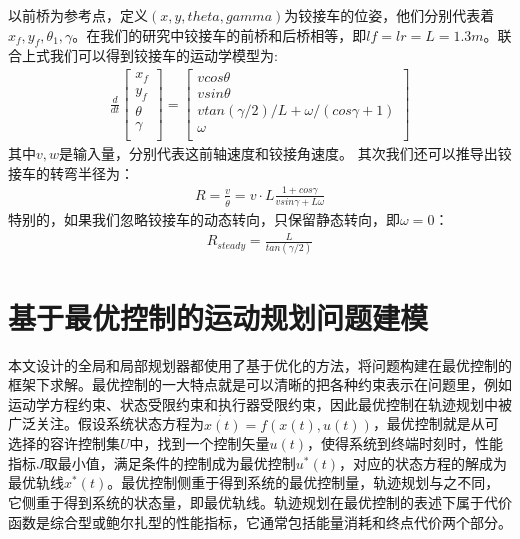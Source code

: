 \documentclass[master,academic]{ysuthesis} %
\begin{document}
	以前桥为参考点，定义$(x,y,theta,gamma)$为铰接车的位姿，他们分别代表着$x_f,y_f,\theta_1,\gamma$。在我们的研究中铰接车的前桥和后桥相等，即$lf=lr=L=1.3m$。联合上式我们可以得到铰接车的运动学模型为:
	\begin{equation}
		\begin{aligned}
			\frac{d}{dt}\left[ \begin{array}{c}
				x_f\\
				y_f\\
				\theta\\
				\gamma\\
			\end{array} \right] =\left[ \begin{array}{c}
				vcos\theta\\
				vsin\theta\\
				vtan( \gamma /2 ) /L+\omega /( cos\gamma +1 )\\
				\omega\\
			\end{array} \right] 
		\end{aligned}
	\end{equation}
	其中$v,w$是输入量，分别代表这前轴速度和铰接角速度。
	其次我们还可以推导出铰接车的转弯半径为：
	\begin{equation}
		\begin{aligned}
			R = \frac{v}{\dot{\theta}} = v\cdot L \frac{1+cos\gamma}{vsin\gamma+L\omega }
		\end{aligned}
	\end{equation}
	特别的，如果我们忽略铰接车的动态转向，只保留静态转向，即$\omega=0$：
	\begin{equation}
		\begin{aligned}
			R_{steady} = \frac{L}{tan(\gamma/2)} 
		\end{aligned}
	\end{equation}

		
		
	\section{基于最优控制的运动规划问题建模}
	本文设计的全局和局部规划器都使用了基于优化的方法，将问题构建在最优控制的框架下求解。最优控制的一大特点就是可以清晰的把各种约束表示在问题里，例如运动学方程约束、状态受限约束和执行器受限约束，因此最优控制在轨迹规划中被广泛关注。假设系统状态方程为$\dot{x(t)}=f(x(t),u(t))$，最优控制就是从可选择的容许控制集$U$中，找到一个控制矢量$u(t)$，使得系统到终端时刻时，性能指标$J$取最小值，满足条件的控制成为最优控制$u^{*}(t)$，对应的状态方程的解成为最优轨线$x^{*}(t)$。最优控制侧重于得到系统的最优控制量，轨迹规划与之不同，它侧重于得到系统的状态量，即最优轨线。轨迹规划在最优控制的表述下属于代价函数是综合型或鲍尔扎型的性能指标，它通常包括能量消耗和终点代价两个部分。
	
\end{document}
